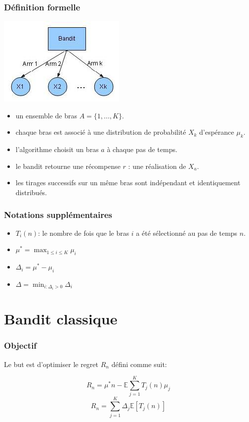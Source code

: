 \documentclass{beamer}
\begin{document}
\begin{frame}
    \frametitle{Définition formelle}
    \begin{center}
        \includegraphics[scale=0.5]{bandit.jpg}
    \end{center}
    \begin{itemize}
        \item un ensemble de bras $A=\{1,...,K\}$.
        \item chaque bras est associé à une distribution de probabilité $X_k$ d'espérance $\mu_k$.
        \item l'algorithme choisit un bras $a$ à chaque pas de temps.
        \item le bandit retourne une récompense $r$ : une réalisation de $X_a$.
        \item les tirages successifs sur un même bras sont indépendant et identiquement distribués.
    \end{itemize}
\end{frame}



\begin{frame}
    \frametitle{Notations supplémentaires}
    \begin{itemize}
        \item $T_i(n)$: le nombre de fois que le bras $i$ a été sélectionné au pas de temps $n$.
        \item $\mu^* = \max_{1 \le i \le K}\mu_i$
        \item $\Delta_i = \mu^* - \mu_i$ 
        \item $\Delta = \min_{i:\Delta_i > 0}\Delta_i$
    \end{itemize}


\end{frame}

\section{Bandit classique}

\begin{frame}
    \frametitle{Objectif}

    Le but est d'optimiser le regret $R_n$ défini comme suit:

    $$R_n=\mu^*n - \mathbb{E} \sum_{j=1}^{K}  T_j(n) \mu_j$$
    $$R_n=\sum_{j=1}^{K} \Delta_j \mathbb{E} [T_j(n)]$$

\end{frame}
\end{document}
